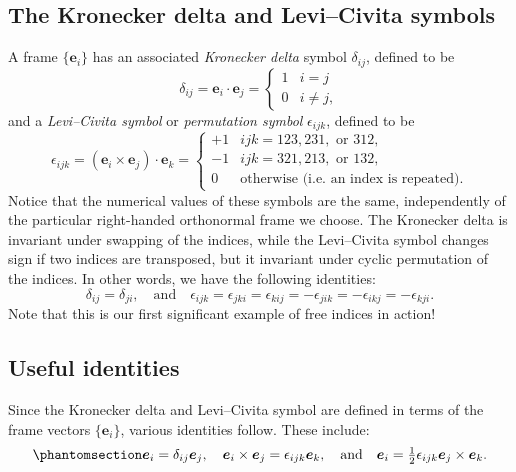 \documentclass[
  letterpaper,
  DIV=11,
  numbers=noendperiod]{scrreprt}
\theoremstyle{plain}
\theoremstyle{remark}
\begin{document}
\subsection{The Kronecker delta and Levi--Civita
symbols}\label{the-kronecker-delta-and-levicivita-symbols}

A frame \(\{{\boldsymbol{e}}_i\}\) has an associated \emph{Kronecker
delta} symbol \(\delta_{ij}\), defined to be
\[\delta_{ij} = {\boldsymbol{e}}_i\cdot{\boldsymbol{e}}_j =\begin{cases}
    1 & i=j\\
    0 &i\neq j,
  \end{cases}\] and a \emph{Levi--Civita symbol} or \emph{permutation
symbol} \(\epsilon_{ijk}\), defined to be
\[\epsilon_{ijk} = ({\boldsymbol{e}}_i\times {\boldsymbol{e}}_j)\cdot {\boldsymbol{e}}_k = \begin{cases}
    +1 & ijk = 123, 231,\text{ or }312,\\
    -1 & ijk = 321, 213,\text{ or }132,\\
    0 & \text{otherwise (i.e. an index is repeated).}
  \end{cases}\] Notice that the numerical values of these symbols are
the same, independently of the particular right-handed orthonormal frame
we choose. The Kronecker delta is invariant under swapping of the
indices, while the Levi--Civita symbol changes sign if two indices are
transposed, but it invariant under cyclic permutation of the indices. In
other words, we have the following identities:
\[\delta_{ij} = \delta_{ji},\quad\text{and}\quad\epsilon_{ijk} = \epsilon_{jki}=\epsilon_{kij}= -\epsilon_{jik} = -\epsilon_{ikj} = -\epsilon_{kji}.\]
Note that this is our first significant example of free indices in
action!

\subsection{Useful identities}\label{useful-identities}

Since the Kronecker delta and Levi--Civita symbol are defined in terms
of the frame vectors \(\{{\boldsymbol{e}}_i\}\), various identities
follow. These include:
\begin{equation}\phantomsection\label{eq-frameidentities}{
  {\boldsymbol{e}}_i = \delta_{ij}{\boldsymbol{e}}_j,\quad {\boldsymbol{e}}_i\times{\boldsymbol{e}}_j = \epsilon_{ijk}{\boldsymbol{e}}_k,\quad\text{and}\quad{\boldsymbol{e}}_i = \tfrac12\epsilon_{ijk}{\boldsymbol{e}}_j\times{\boldsymbol{e}}_k.
}\end{equation}
\end{document}
